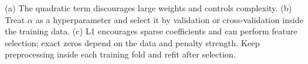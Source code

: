 (a) The quadratic term discourages large weights and controls complexity.
(b) Treat \ensuremath{\alpha} as a hyperparameter and select it by validation or cross-validation inside the training data.
(c) L1 encourages sparse coefficients and can perform feature selection; exact zeros depend on the data and penalty strength. Keep preprocessing inside each training fold and refit after selection.
